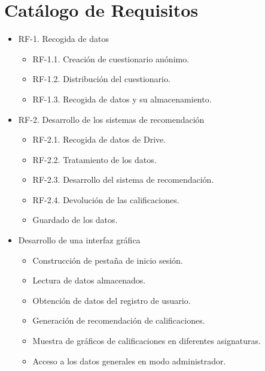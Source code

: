 \section{Catálogo de Requisitos}
\begin{itemize}
\item RF-1. Recogida de datos\\ 
\begin{itemize}
\item RF-1.1. Creación de cuestionario anónimo.\\ 
\item RF-1.2. Distribución del cuestionario. \\ 
\item RF-1.3. Recogida de datos y su almacenamiento. 
\end{itemize}

\item RF-2. Desarrollo de los sistemas de recomendación\\ 
\begin{itemize}
\item RF-2.1. Recogida de datos de Drive. 
\item RF-2.2. Tratamiento de los datos. 
\item RF-2.3. Desarrollo del sistema de recomendación. 
\item RF-2.4. Devolución de las calificaciones. \item Guardado de los datos. 
\end{itemize}

\item Desarrollo de una interfaz gráfica \\ \begin{itemize}
\item Construcción de pestaña de inicio sesión.  \item Lectura de datos almacenados. \item Obtención de datos del registro de usuario. \item Generación de recomendación de calificaciones. \item Muestra de gráficos de calificaciones en diferentes asignaturas. \item Acceso a los datos generales en modo administrador. 
\end{itemize}
\end{itemize}


